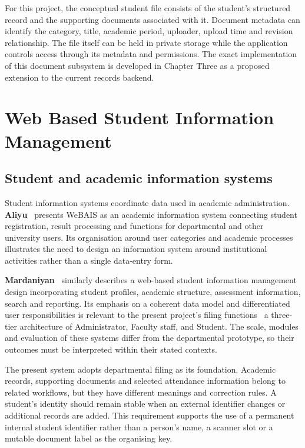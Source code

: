 For this project, the conceptual student file consists of the student's structured record and the supporting documents associated with it. Document metadata can identify the category, title, academic period, uploader, upload time and revision relationship. The file itself can be held in private storage while the application controls access through its metadata and permissions. The exact implementation of this document subsystem is developed in Chapter Three as a proposed extension to the current records backend.

\section{Web Based Student Information Management}\label{sec:2-3}

\subsection{Student and academic information systems}\label{sec:2-3-1}

Student information systems coordinate data used in academic administration. \textbf{Aliyu}~\cite{aliyu2015} presents WeBAIS as an academic information system connecting student registration, result processing and functions for departmental and other university users. Its organisation around user categories and academic processes illustrates the need to design an information system around institutional activities rather than a single data-entry form.

\textbf{Mardaniyan}~\cite{mardaniyan2019} similarly describes a web-based student information management design incorporating student profiles, academic structure, assessment information, search and reporting. Its emphasis on a coherent data model and differentiated user responsibilities is relevant to the present project's filing functions \textemdash~a three-tier architecture of Administrator, Faculty staff, and Student. The scale, modules and evaluation of these systems differ from the departmental prototype, so their outcomes must be interpreted within their stated contexts.

The present system adopts departmental filing as its foundation. Academic records, supporting documents and selected attendance information belong to related workflows, but they have different meanings and correction rules. A student's identity should remain stable when an external identifier changes or additional records are added. This requirement supports the use of a permanent internal student identifier rather than a person's name, a scanner slot or a mutable document label as the organising key.

